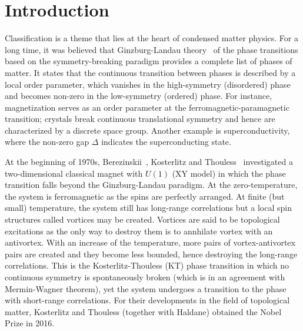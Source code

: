 \cleardoublepage{}
\chapter*{Introduction}
\label{ch:introduction}


Classification is a theme that lies at the heart of condensed matter physics. For a long time, it was believed that Ginzburg-Landau theory~\cite{Landau1950} of the phase transitions based on the symmetry-breaking paradigm provides a complete list of phases of matter. It states that the continuous transition between phases is described by a local order parameter, which vanishes in the high-symmetry (disordered) phase and becomes non-zero in the low-symmetry (ordered) phase. For instance, magnetization serves as an order parameter at the ferromagnetic-paramagnetic transition; crystals break continuous translational symmetry and hence are characterized by a discrete space group. Another example is superconductivity, where the non-zero gap $\Delta$ indicates the superconducting state.

At the beginning of 1970s, Berezinskii~\cite{Berezinsky:1970fr, Berezinsky:1972rfj}, Kosterlitz and Thouless~\cite{Kosterlitz_1972, Kosterlitz_1973} investigated a two-dimensional classical magnet with $U(1)$ (XY model) in which the phase transition falls beyond the Ginzburg-Landau paradigm. At the zero-temperature, the system is ferromagnetic as the spins are perfectly arranged. At finite (but small) temperature, the system still has long-range correlations but a local spin structures called vortices may be created. Vortices are said to be topological excitations as the only way to destroy them is to annhilate vortex with an antivortex. With an increase of the temperature, more pairs of vortex-antivortex pairs are created and they become less bounded, hence destroying the long-range correlations. This is the Kosterlitz-Thouless (KT) phase transition in which no continuous symmetry is spontaneously broken (which is in an agreement with Mermin-Wagner theorem), yet the system undergoes a transition to the phase with short-range correlations. For their developments in the field of topological matter, Kosterlitz and Thouless (together with Haldane) obtained the Nobel Prize in 2016.

